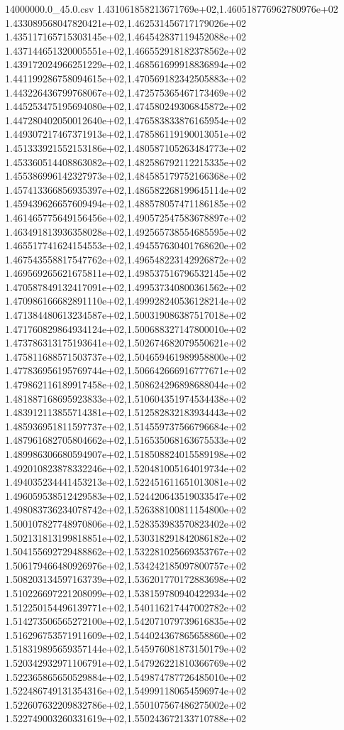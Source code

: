 \begin{filecontents*}{14000000.0_45.0.csv}
1.431061858213671769e+02,1.460518776962780976e+02
1.433089568047820421e+02,1.462531456717179026e+02
1.435117165715303145e+02,1.464542837119452088e+02
1.437144651320005551e+02,1.466552918182378562e+02
1.439172024966251229e+02,1.468561699918836894e+02
1.441199286758094615e+02,1.470569182342505883e+02
1.443226436799768067e+02,1.472575365467173469e+02
1.445253475195694080e+02,1.474580249306845872e+02
1.447280402050012640e+02,1.476583833876165954e+02
1.449307217467371913e+02,1.478586119190013051e+02
1.451333921552153186e+02,1.480587105263484773e+02
1.453360514408863082e+02,1.482586792112215335e+02
1.455386996142327973e+02,1.484585179752166368e+02
1.457413366856935397e+02,1.486582268199645114e+02
1.459439626657609494e+02,1.488578057471186185e+02
1.461465775649156456e+02,1.490572547583678897e+02
1.463491813936358028e+02,1.492565738554685595e+02
1.465517741624154553e+02,1.494557630401768620e+02
1.467543558817547762e+02,1.496548223142926872e+02
1.469569265621675811e+02,1.498537516796532145e+02
1.470587849132417091e+02,1.499537340800361562e+02
1.470986166682891110e+02,1.499928240536128214e+02
1.471384480613234587e+02,1.500319086387517018e+02
1.471760829864934124e+02,1.500688327147800010e+02
1.473786313175193641e+02,1.502674682079550621e+02
1.475811688571503737e+02,1.504659461989958800e+02
1.477836956195769744e+02,1.506642666916777671e+02
1.479862116189917458e+02,1.508624296898688044e+02
1.481887168695923833e+02,1.510604351974534438e+02
1.483912113855714381e+02,1.512582832183934443e+02
1.485936951811597737e+02,1.514559737566796684e+02
1.487961682705804662e+02,1.516535068163675533e+02
1.489986306680594907e+02,1.518508824015589198e+02
1.492010823878332246e+02,1.520481005164019734e+02
1.494035234441453213e+02,1.522451611651013081e+02
1.496059538512429583e+02,1.524420643519033547e+02
1.498083736234078742e+02,1.526388100811154800e+02
1.500107827748970806e+02,1.528353983570823402e+02
1.502131813199818851e+02,1.530318291842086182e+02
1.504155692729488862e+02,1.532281025669353767e+02
1.506179466480926976e+02,1.534242185097800757e+02
1.508203134597163739e+02,1.536201770172883698e+02
1.510226697221208099e+02,1.538159780940422934e+02
1.512250154496139771e+02,1.540116217447002782e+02
1.514273506565272100e+02,1.542071079739616835e+02
1.516296753571911609e+02,1.544024367865658860e+02
1.518319895659357144e+02,1.545976081873150179e+02
1.520342932971106791e+02,1.547926221810366769e+02
1.522365865650529884e+02,1.549874787726485010e+02
1.522486749131354316e+02,1.549991180654596974e+02
1.522607632209832786e+02,1.550107567486275002e+02
1.522749003260331619e+02,1.550243672133710788e+02

\end{filecontents*}
